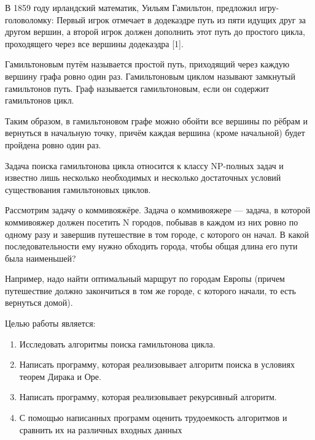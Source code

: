 





\clearpage
\setcounter{page}{2}

\tableofcontents
\newpage


В 1859 году ирландский математик, Уильям Гамильтон, предложил игру-головоломку:
Первый игрок отмечает в додекаэдре путь из пяти идущих друг за другом вершин, а второй игрок должен дополнить этот путь до простого цикла, проходящего
через все вершины додекаэдра [1].

Гамильтоновым путём называется простой путь, приходящий через каждую вершину графа ровно один раз.
Гамильтоновым циклом называют замкнутый гамильтонов путь.
Граф называется гамильтоновым, если он содержит гамильтонов цикл.

Таким образом, в гамильтоновом графе можно обойти все вершины по рёбрам и вернуться в начальную точку, причём каждая вершина (кроме начальной) будет пройдена ровно один раз.

Задача поиска гамильтонова цикла относится к классу NP-полных задач и известно лишь несколько необходимых и несколько достаточных условий существования гамильтоновых циклов.

Рассмотрим задачу о коммивояжёре.
Задача о коммивояжере — задача, в которой коммивояжер должен посетить N городов, побывав в каждом из них ровно по одному разу и завершив путешествие в том городе, с которого он начал.
В какой последовательности ему нужно обходить города, чтобы общая длина его пути была наименьшей?

Например, надо найти оптимальный марщрут по городам Европы (причем путешествие должно закончиться в том же городе, с которого начали, то есть вернуться домой).

Целью работы является:

\begin{enumerate}

    \item Исследовать алгоритмы поиска гамильтонова цикла.

    \item Написать программу, которая реализовывает алгоритм поиска в условиях теорем Дирака и Оре.

    \item Написать программу, которая реализовывает рекурсивный алгоритм.

    \item С помощью написанных программ оценить трудоемкость алгоритмов и сравнить их на различных входных данных

\end{enumerate}

